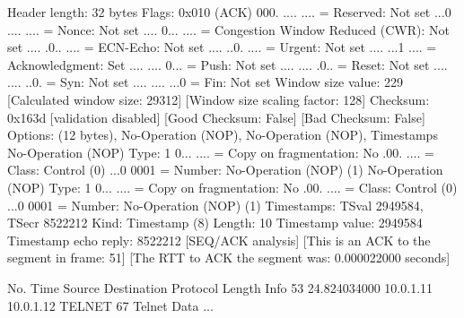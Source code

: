     Header length: 32 bytes
    Flags: 0x010 (ACK)
        000. .... .... = Reserved: Not set
        ...0 .... .... = Nonce: Not set
        .... 0... .... = Congestion Window Reduced (CWR): Not set
        .... .0.. .... = ECN-Echo: Not set
        .... ..0. .... = Urgent: Not set
        .... ...1 .... = Acknowledgment: Set
        .... .... 0... = Push: Not set
        .... .... .0.. = Reset: Not set
        .... .... ..0. = Syn: Not set
        .... .... ...0 = Fin: Not set
    Window size value: 229
    [Calculated window size: 29312]
    [Window size scaling factor: 128]
    Checksum: 0x163d [validation disabled]
        [Good Checksum: False]
        [Bad Checksum: False]
    Options: (12 bytes), No-Operation (NOP), No-Operation (NOP), Timestamps
        No-Operation (NOP)
            Type: 1
                0... .... = Copy on fragmentation: No
                .00. .... = Class: Control (0)
                ...0 0001 = Number: No-Operation (NOP) (1)
        No-Operation (NOP)
            Type: 1
                0... .... = Copy on fragmentation: No
                .00. .... = Class: Control (0)
                ...0 0001 = Number: No-Operation (NOP) (1)
        Timestamps: TSval 2949584, TSecr 8522212
            Kind: Timestamp (8)
            Length: 10
            Timestamp value: 2949584
            Timestamp echo reply: 8522212
    [SEQ/ACK analysis]
        [This is an ACK to the segment in frame: 51]
        [The RTT to ACK the segment was: 0.000022000 seconds]

No.     Time           Source                Destination           Protocol Length Info
     53 24.824034000   10.0.1.11             10.0.1.12             TELNET   67     Telnet Data ...

